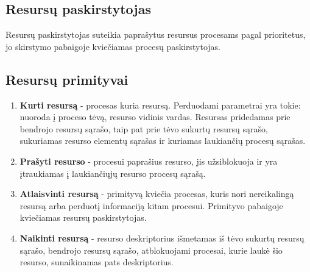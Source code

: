 		
	\subsection{Resursų paskirstytojas}
		Resursų paskirstytojas suteikia paprašytus resursus procesams pagal prioritetus, jo skirstymo pabaigoje kviečiamas procesų paskirstytojas. 
	\subsection{Resursų primityvai}
		\begin{enumerate}
			\item \textbf{Kurti resursą} - procesas kuria resursą. Perduodami parametrai yra tokie: nuoroda į proceso tėvą, resurso vidinis vardas. Resursas pridedamas prie bendrojo resursų sąrašo, taip pat prie tėvo sukurtų resursų sąrašo, sukuriamas resurso elementų sąrašas ir kuriamas laukiančių procesų sąrašas.
			\item \textbf{Prašyti resurso} - procesui paprašius resurso, jis užsiblokuoja ir yra įtraukiamas į laukiančiųjų resurso procesų sąrašą.
			\item \textbf{Atlaisvinti resursą} - primityvą kviečia procesas, kuris nori nereikalingą resursą arba perduotį informaciją kitam procesui. Primityvo pabaigoje kviečiamas resursų paskirstytojas.
			\item \textbf{Naikinti resursą} - resurso deskriptorius išmetamas iš tėvo sukurtų resursų sąrašo, bendrojo resursų sąrašo, atblokuojami procesai, kurie laukė šio resurso, sunaikinamas pats deskriptorius.
		\end{enumerate}
		